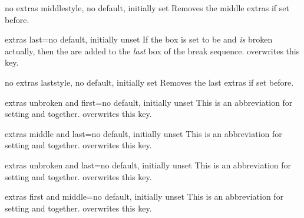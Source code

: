 \begin{docTcbKey}[][doc new=2015-07-16]{no extras middle}{}{style, no default, initially set}
  Removes the middle extras if set before.
\end{docTcbKey}

\begin{docTcbKey}[][doc new=2015-07-16]{extras last}{=}{no default, initially unset}
  If the box is set to be  and \emph{is} broken actually,
  then the  are added to the \emph{last} box of the break sequence.
   overwrites this key.
\end{docTcbKey}

\begin{docTcbKey}[][doc new=2015-07-16]{no extras last}{}{style, no default, initially set}
  Removes the last extras if set before.
\end{docTcbKey}

\clearpage

\begin{docTcbKey}[][doc new=2015-07-16]{extras unbroken and first}{=}{no default, initially unset}
  This is an abbreviation for setting
   and
   together.
   overwrites this key.
\end{docTcbKey}

\begin{docTcbKey}[][doc new=2015-07-16]{extras middle and last}{=}{no default, initially unset}
  This is an abbreviation for setting
   and
   together.
   overwrites this key.
\end{docTcbKey}

\begin{docTcbKey}[][doc new=2015-07-16]{extras unbroken and last}{=}{no default, initially unset}
  This is an abbreviation for setting
   and
   together.
   overwrites this key.
\end{docTcbKey}

\begin{docTcbKey}[][doc new=2015-07-16]{extras first and middle}{=}{no default, initially unset}
  This is an abbreviation for setting
   and
   together.
   overwrites this key.
\end{docTcbKey}


